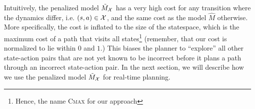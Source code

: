 Intuitively, the penalized model $\tilde{M}_{\mathcal{X}}$
has a very high cost for any transition where the dynamics differ,
i.e. $(s, a) \in \mathcal{X}$, and
the same cost as the model $\hat{M}$ otherwise. More specifically, the
cost is inflated to the size of the statespace, which is the maximum
cost of a path that visits all states\footnote{Hence, the name \textsc{Cmax} for our approach} (remember, that our cost is
normalized to lie within $0$ and $1$.) This biases the planner to ``explore'' all other
state-action pairs that are not yet known to be incorrect before it
plans a path through an incorrect state-action pair.
In the next section, we
will describe how we use the penalized model
$\tilde{M}_{\mathcal{X}}$ for real-time planning.


